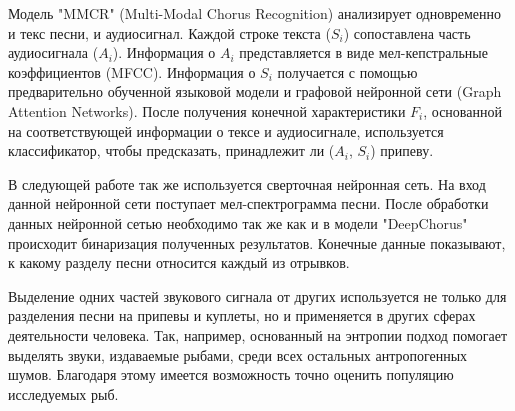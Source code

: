 Модель "MMCR" (Multi-Modal Chorus Recognition)\cite{MMCR} анализирует одновременно и текс песни, и аудиосигнал. Каждой строке текста ($S_i$) сопоставлена часть аудиосигнала ($A_i$). Информация о $A_i$ представляется в виде мел-кепстральные коэффициентов (MFCC). Информация о $S_i$ получается с помощью
предварительно обученной языковой модели и графовой нейронной сети (Graph Attention Networks). После получения конечной характеристики $F_i$, основанной на соответствующей информации о тексе и аудиосигнале, используется классификатор, чтобы предсказать, принадлежит ли ($A_i$, $S_i$) припеву.

В следующей работе\cite{ByteDance} так же используется сверточная нейронная сеть. На вход данной нейронной сети поступает мел-спектрограмма песни. После обработки данных нейронной сетью необходимо так же как и в модели "DeepChorus"\cite{DeepChorus} происходит бинаризация полученных результатов. Конечные данные показывают, к какому разделу песни относится каждый из отрывков.

Выделение одних частей звукового сигнала от других используется не только для разделения песни на припевы и куплеты, но и применяется в других сферах деятельности человека. Так, например, основанный на энтропии подход\cite{Fish} помогает выделять звуки, издаваемые рыбами, среди всех остальных антропогенных шумов. Благодаря этому имеется возможность точно оценить популяцию исследуемых рыб.


